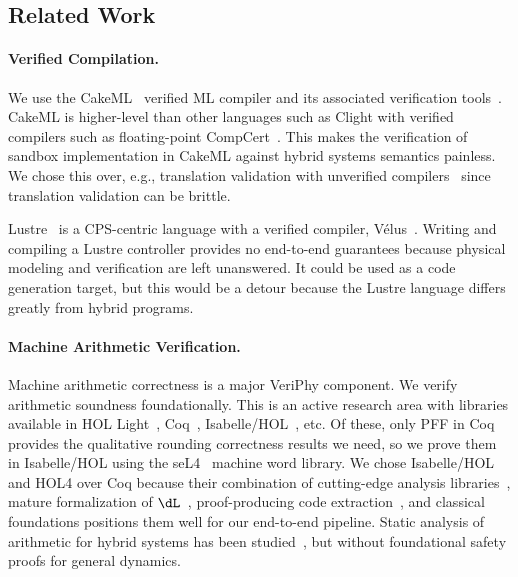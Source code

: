 \documentclass[12pt]{cmuthesis}
\theoremstyle{definition}
\theoremstyle{remark}
\newcommand{\Isabelle}{Isabelle/HOL\xspace}
\newcommand{\VeriPhy}{VeriPhy\xspace}
\begin{document}
\subsection{Related Work}
\paragraph{Verified Compilation.}
We use the CakeML~\cite{DBLP:conf/icfp/TanMKFON16} verified ML compiler and its associated verification tools~\cite{DBLP:conf/icfp/MyreenO12,DBLP:conf/esop/GueneauMKN17}.
CakeML is higher-level than other languages such as Clight with verified compilers such as floating-point CompCert~\cite{DBLP:conf/arith/BoldoJLM13}.
This makes the verification of sandbox implementation in CakeML against hybrid systems semantics painless.
We chose this over, e.g., translation validation with unverified compilers~\cite{DBLP:conf/pldi/SewellMK13} since translation validation can be brittle.

Lustre~\cite{DBLP:journals/tse/HalbwachsLR92} is a CPS-centric language with a verified compiler, V\'{e}lus~\cite{DBLP:conf/pldi/BourkeBDLPR17}.
Writing and compiling a Lustre controller provides no end-to-end guarantees because physical modeling and verification are left unanswered.
It could be used as a code generation target, but this would be a detour because the Lustre language differs greatly from hybrid programs.

\paragraph{Machine Arithmetic Verification.}
Machine arithmetic correctness is a major \VeriPhy component.
We verify arithmetic soundness foundationally.
This is an active research area with libraries available in HOL Light~\cite{DBLP:conf/sfm/Harrison06}, Coq~\cite{DBLP:conf/arith/BoldoM10,DBLP:conf/tphol/DaumasRT01,DBLP:conf/mkm/BoldoFM09,DBLP:journals/iandc/Melquiond12}, \Isabelle~\cite{DBLP:journals/afp/Yu13}, etc.
Of these, only PFF in Coq~\cite{DBLP:conf/tphol/DaumasRT01} provides the qualitative rounding correctness results we need, so we prove them in \Isabelle using the seL4~\cite{DBLP:journals/cacm/KleinAEHCDEEKNSTW10} machine word library.
We chose \Isabelle and HOL4 over Coq because their combination of cutting-edge analysis libraries~\cite{DBLP:conf/itp/ImmlerT16}, mature formalization of $\dL$~\cite{DBLP:conf/cpp/BohrerRVVP17}, proof-producing code extraction~\cite{DBLP:conf/icfp/MyreenO12}, and classical foundations positions them well for our end-to-end pipeline.
Static analysis of arithmetic for hybrid systems has been studied~\cite{DBLP:conf/emsoft/MartinezMST10,DBLP:conf/emsoft/MajumdarSZ12,DBLP:conf/cav/BouissouGPTV09}, but without foundational safety proofs for general dynamics.
\end{document}
